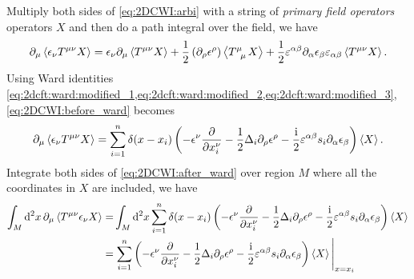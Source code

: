 \documentclass[10pt]{article}
\newcommand{\ii}{\mathrm{i}}
\begin{document}
Multiply both sides of \cref{eq:2DCWI:arbi} with a string of \textit{primary field operators} operators $X$ and then do a path integral over the field, we have
\begin{align}
    \partial_\mu\expval{\epsilon_\nu T^{\mu\nu}X}=\epsilon_\nu\partial_\mu\expval{T^{\mu\nu}X}+\frac{1}{2}\left(\partial_\rho \epsilon^\rho\right)\expval{\tensor{T}{^\mu_\mu}X}+\frac{1}{2}\varepsilon^{\alpha\beta}\partial_\alpha\epsilon_\beta\varepsilon_{\alpha\beta}\expval{T^{\mu\nu}X}.\label{eq:2DCWI:before_ward}
\end{align}
Using Ward identities \cref{eq:2dcft:ward:modified_1,eq:2dcft:ward:modified_2,eq:2dcft:ward:modified_3}, \cref{eq:2DCWI:before_ward} becomes
\begin{align}
    \partial_\mu\expval{\epsilon_\nu T^{\mu\nu}X}=\sum_{i=1}^n\delta(x-x_i)\left(-\epsilon^\nu\pdv{x_i^\nu}-\frac{1}{2}\Delta_i\partial_\rho\epsilon^\rho-\frac{\ii}{2}\varepsilon^{\alpha\beta} s_i\partial_\alpha\epsilon_\beta\right)\expval{X}.\label{eq:2DCWI:after_ward}
\end{align}
Integrate both sides of \cref{eq:2DCWI:after_ward} over region $M$ where all the coordinates in $X$ are included, we have
\begin{align}
    \int_M\dd[2]{x}\partial_\mu\expval{T^{\mu\nu}\epsilon_\nu X}= & \int_M\dd[2]{x}\sum_{i=1}^n\delta(x-x_i)\left(-\epsilon^\nu\pdv{x_i^\nu}-\frac{1}{2}\Delta_i\partial_\rho\epsilon^\rho-\frac{\ii}{2}\varepsilon^{\alpha\beta} s_i\partial_\alpha\epsilon_\beta\right)\expval{X}\notag                  \\
    =                                                             & \eval{\sum_{i=1}^n\left(-\epsilon^\nu\pdv{x_i^\nu}-\frac{1}{2}\Delta_i\partial_\rho\epsilon^\rho-\frac{\ii}{2}\varepsilon^{\alpha\beta} s_i\partial_\alpha\epsilon_\beta\right)\expval{X}}_{x=x_i}\label{eq:2dcft:ward_before_primary}
\end{align}
\end{document}
